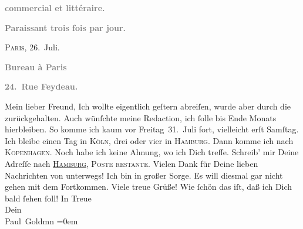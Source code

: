 \begin{ledgroupsized}[t]{13cm}
           \pstart
           \begin{otherlanguage}{french}\textcolor{gray}{\textbf{commercial et littéraire.}}\end{otherlanguage}\pend
           \pstart
           \begin{otherlanguage}{french}\textcolor{gray}{\textbf{\textbf{Paraissant trois fois par jour.}}}\end{otherlanguage}\hfill \textsc{Paris}, 26. Juli.\pend
           \pstart
           \begin{otherlanguage}{french}\textcolor{gray}{\textbf{\textbf{Bureau à Paris}}}\end{otherlanguage}\pend
           \pstart
           \begin{otherlanguage}{french}\textcolor{gray}{\textbf{\textbf{24. Rue Feydeau.}}}\end{otherlanguage}\pend
           \pstart\center{}Mein lieber Freund,\pend\pstart
           Ich wollte eigentlich geſtern abreiſen, wurde aber
               durch die \label{K_L02783-1v}\label{K_L02783-1h} zurückgehalten. Auch wünſchte meine Redaction, ich ſolle bis Ende Monats hierbleiben. So komme ich kaum vor Freitag 31. Juli fort, vielleicht erſt Samſtag. Ich bleibe einen Tag in \textsc{Köln}, drei oder vier in \textsc{Hamburg}. Dann komme ich nach \textsc{Kopenhagen}. Noch habe ich keine Ahnung, wo {\pb}ich Dich
               treffe. Schreib’ mir Deine Adreſſe nach \textsc{\uline{Hamburg}}, \textsc{Poste restante}. Vielen Dank für Deine lieben
               Nachrichten von unterwegs! Ich bin in großer Sorge. Es will diesmal gar nicht gehen
               mit dem Fortkommen.\pend
           \pstart
           Viele treue Grüße!\pend
           \pstart
           Wie ſchön das iſt, daß ich Dich bald ſehen ſoll!\pend
           \pstart
           In Treue {\\[\baselineskip]}Dein {\\[\baselineskip]}\spacefill\mbox{Paul Goldmn}\pend
           \leftskip=0em{}
         
         \endnumbering{}\end{ledgroupsized}  \newcommand{\dateiname}{L02783}\newcommand{\titel}{Paul Goldmann an Arthur Schnitzler, 26. 7. [1896]}\newcommand{\editorInnen}{Martin Anton Müller und Laura Untner}
      